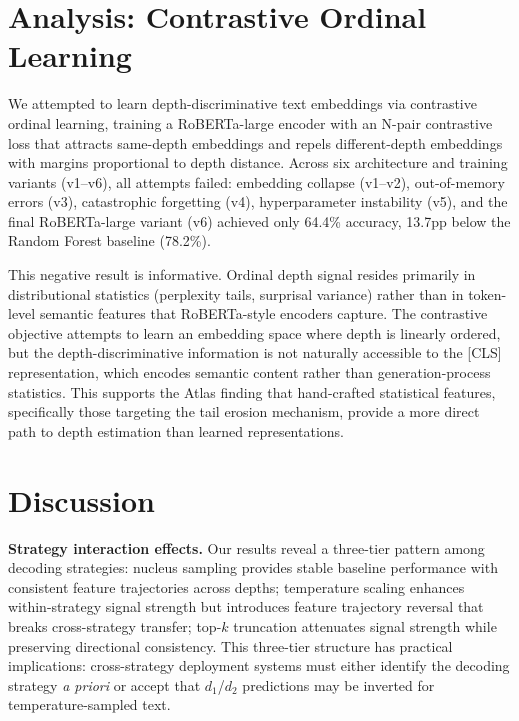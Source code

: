 \documentclass[11pt,a4paper]{article}
\begin{document}
\section{Analysis: Contrastive Ordinal Learning}

We attempted to learn depth-discriminative text embeddings via contrastive ordinal learning, training a RoBERTa-large encoder with an N-pair contrastive loss that attracts same-depth embeddings and repels different-depth embeddings with margins proportional to depth distance. Across six architecture and training variants (v1--v6), all attempts failed: embedding collapse (v1--v2), out-of-memory errors (v3), catastrophic forgetting (v4), hyperparameter instability (v5), and the final RoBERTa-large variant (v6) achieved only 64.4\% accuracy, 13.7pp below the Random Forest baseline (78.2\%).

This negative result is informative. Ordinal depth signal resides primarily in distributional statistics (perplexity tails, surprisal variance) rather than in token-level semantic features that RoBERTa-style encoders capture. The contrastive objective attempts to learn an embedding space where depth is linearly ordered, but the depth-discriminative information is not naturally accessible to the [CLS] representation, which encodes semantic content rather than generation-process statistics. This supports the Atlas finding that hand-crafted statistical features, specifically those targeting the tail erosion mechanism, provide a more direct path to depth estimation than learned representations.

\section{Discussion}
\label{sec:discussion}

\textbf{Strategy interaction effects.} Our results reveal a three-tier pattern among decoding strategies: nucleus sampling provides stable baseline performance with consistent feature trajectories across depths; temperature scaling enhances within-strategy signal strength but introduces feature trajectory reversal that breaks cross-strategy transfer; top-$k$ truncation attenuates signal strength while preserving directional consistency. This three-tier structure has practical implications: cross-strategy deployment systems must either identify the decoding strategy \textit{a priori} or accept that $d_1$/$d_2$ predictions may be inverted for temperature-sampled text.
\end{document}
